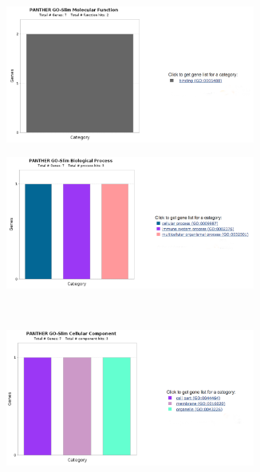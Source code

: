 \begin{figure}[H]
\label{adpdANDadfigure}
\begin{subfigure}[b]{0.5\linewidth}
\centering
\includegraphics[width=0.9\textwidth]{./Figures/GO/adpdANDad/adpdANDad1}\par
\end{subfigure}
\begin{subfigure}[b]{0.5\linewidth}
\centering
\includegraphics[width=0.9\textwidth]{./Figures/GO/adpdANDad/adpdANDad2}\par
\end{subfigure}\\
\begin{subfigure}[b]{0.5\linewidth}
\centering
\includegraphics[width=0.9\textwidth]{./Figures/GO/adpdANDad/adpdANDad3}\par

\end{subfigure}
\end{figure}
